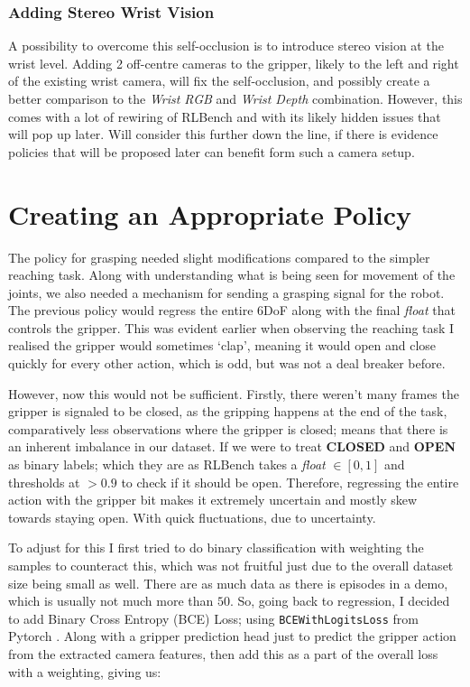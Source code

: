 \subsubsection{Adding Stereo Wrist Vision}
A possibility to overcome this self-occlusion is to introduce stereo vision at the wrist level. Adding 2 off-centre cameras to the gripper, likely to the left and right of the existing wrist camera, will fix the self-occlusion, and possibly create a better comparison to the \emph{Wrist RGB} and \emph{Wrist Depth} combination. However, this comes with a lot of rewiring of RLBench and with its likely hidden issues that will pop up later. Will consider this further down the line, if there is evidence policies that will be proposed later can benefit form such a camera setup.




\section{Creating an Appropriate Policy}
The policy for grasping needed slight modifications compared to the simpler reaching task. Along with understanding what is being seen for movement of the joints, we also needed a mechanism for sending a grasping signal for the robot. The previous policy would regress the entire 6DoF along with the final \emph{float} that controls the gripper. This was evident earlier when observing the reaching task I realised the gripper would sometimes `clap', meaning it would open and close quickly for every other action, which is odd, but was not a deal breaker before.

However, now this would not be sufficient. Firstly, there weren't many frames the gripper is signaled to be closed, as the gripping happens at the end of the task, comparatively less observations where the gripper is closed; means that there is an inherent imbalance in our dataset. If we were to treat \textbf{CLOSED} and \textbf{OPEN} as binary labels; which they are as RLBench takes a \emph{float} $\in \left[0, 1\right]$ and thresholds at $ > 0.9$ to check if it should be open. Therefore, regressing the entire action with the gripper bit makes it extremely uncertain and mostly skew towards staying open. With quick fluctuations, due to uncertainty.

To adjust for this I first tried to do binary classification with weighting the samples to counteract this, which was not fruitful just due to the overall dataset size being small as well. There are as much data as there is episodes in a demo, which is usually not much more than $50$. So, going back to regression, I decided to add Binary Cross Entropy (BCE) Loss; using \verb|BCEWithLogitsLoss| from Pytorch . Along with a gripper prediction head just to predict the gripper action from the extracted camera features, then add this as a part of the overall loss with a weighting, giving us:

